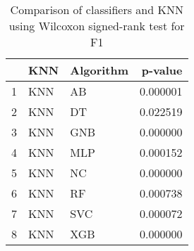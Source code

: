 \begin{table}
\footnotesize
\caption{Comparison of classifiers and KNN using Wilcoxon signed-rank test for F1}
\label{tab:KNN wilcoxon F1 comparison}
\begin{tabular}{lllr}
\hline
 & KNN & Algorithm & p-value \\
\hline
1 & KNN & AB & 0.000001 \\
2 & KNN & DT & 0.022519 \\
3 & KNN & GNB & 0.000000 \\
4 & KNN & MLP & 0.000152 \\
5 & KNN & NC & 0.000000 \\
6 & KNN & RF & 0.000738 \\
7 & KNN & SVC & 0.000072 \\
8 & KNN & XGB & 0.000000 \\
\hline
\end{tabular}
\end{table}
